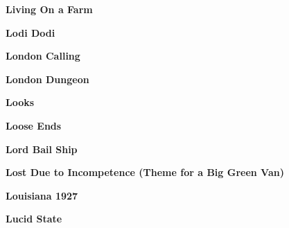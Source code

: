\vspace{10pt} 
\begin{center}\textbf{Living On a Farm}\end{center}
\newline
\vspace{10pt} 
\begin{center}\textbf{Lodi Dodi}\end{center}
\newline
\vspace{10pt} 
\begin{center}\textbf{London Calling}\end{center}
\newline
\vspace{10pt} 
\begin{center}\textbf{London Dungeon}\end{center}
\newline
\vspace{10pt} 
\begin{center}\textbf{Looks}\end{center}
\newline
\vspace{10pt} 
\begin{center}\textbf{Loose Ends}\end{center}
\newline
\vspace{10pt} 
\begin{center}\textbf{Lord Bail Ship}\end{center}
\newline
\vspace{10pt} 
\begin{center}\textbf{Lost Due to Incompetence (Theme for a Big Green Van)}\end{center}
\newline
\vspace{10pt} 
\begin{center}\textbf{Louisiana 1927}\end{center}
\newline
\vspace{10pt} 
\begin{center}\textbf{Lucid State}\end{center}
